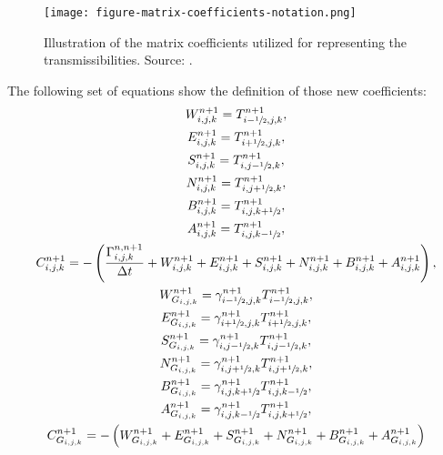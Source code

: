 %
 \begin{figure}[h]
 	\centering
 	\texttt{[image: figure-matrix-coefficients-notation.png]}\\
 	\caption{Illustration of the matrix coefficients utilized for representing the transmissibilities. Source: \cite{Ertekin2001}.}
 	\label{figure-matrix-coefficients-notation}
 \end{figure}
%
The following set of equations show the definition of those new coefficients:
\begin{gather}
	W_{i,j,k}^{n+1}=T_{i-\sfrac{1}{2},j,k}^{n+1},\\
	E_{i,j,k}^{n+1}=T_{i+\sfrac{1}{2},j,k}^{n+1},\\
	S_{i,j,k}^{n+1}=T_{i,j-\sfrac{1}{2},k}^{n+1},\\
	N_{i,j,k}^{n+1}=T_{i,j+\sfrac{1}{2},k}^{n+1},\\
	B_{i,j,k}^{n+1}=T_{i,j,k+\sfrac{1}{2}}^{n+1},\\
	A_{i,j,k}^{n+1}=T_{i,j,k-\sfrac{1}{2}}^{n+1},\\
	C_{i,j,k}^{n+1}=-\left(\frac{\Gamma_{i,j,k}^{n,n+1}}{\Delta t} + W_{i,j,k}^{n+1}+E_{i,j,k}^{n+1}+S_{i,j,k}^{n+1}+N_{i,j,k}^{n+1}+B_{i,j,k}^{n+1}+A_{i,j,k}^{n+1}\right),\\
	W_{G_{i,j,k}}^{n+1}=\gamma_{i-\sfrac{1}{2},j,k}^{n+1}T_{i-\sfrac{1}{2},j,k}^{n+1},\\
	E_{G_{i,j,k}}^{n+1}=\gamma_{i+\sfrac{1}{2},j,k}^{n+1}T_{i+\sfrac{1}{2},j,k}^{n+1},\\
	S_{G_{i,j,k}}^{n+1}=\gamma_{i,j-\sfrac{1}{2},k}^{n+1}T_{i,j-\sfrac{1}{2},k}^{n+1},\\
	N_{G_{i,j,k}}^{n+1}=\gamma_{i,j+\sfrac{1}{2},k}^{n+1}T_{i,j+\sfrac{1}{2},k}^{n+1},\\
	B_{G_{i,j,k}}^{n+1}=\gamma_{i,j,k+\sfrac{1}{2}}^{n+1}T_{i,j,k-\sfrac{1}{2}}^{n+1},\\
	A_{G_{i,j,k}}^{n+1}=\gamma_{i,j,k-\sfrac{1}{2}}^{n+1}T_{i,j,k+\sfrac{1}{2}}^{n+1},\\
	C_{G_{i,j,k}}^{n+1}=-\left( W_{G_{i,j,k}}^{n+1}+E_{G_{i,j,k}}^{n+1}+S_{G_{i,j,k}}^{n+1}+N_{G_{i,j,k}}^{n+1}+B_{G_{i,j,k}}^{n+1}+A_{G_{i,j,k}}^{n+1}\right)
\end{gather}
%
